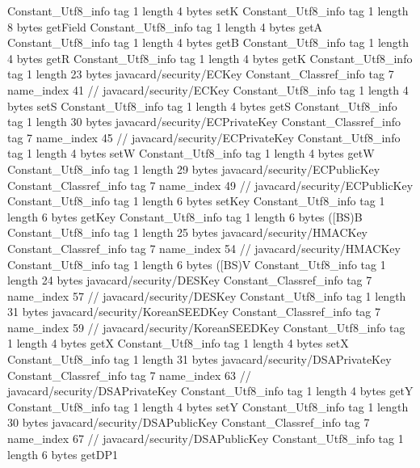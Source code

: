 {{{		}
		Constant_Utf8_info {
			tag	1
			length	4
			bytes	setK
		}
		Constant_Utf8_info {
			tag	1
			length	8
			bytes	getField
		}
		Constant_Utf8_info {
			tag	1
			length	4
			bytes	getA
		}
		Constant_Utf8_info {
			tag	1
			length	4
			bytes	getB
		}
		Constant_Utf8_info {
			tag	1
			length	4
			bytes	getR
		}
		Constant_Utf8_info {
			tag	1
			length	4
			bytes	getK
		}
		Constant_Utf8_info {
			tag	1
			length	23
			bytes	javacard/security/ECKey
		}
		Constant_Classref_info {
			tag	7
			name_index	41		// javacard/security/ECKey
		}
		Constant_Utf8_info {
			tag	1
			length	4
			bytes	setS
		}
		Constant_Utf8_info {
			tag	1
			length	4
			bytes	getS
		}
		Constant_Utf8_info {
			tag	1
			length	30
			bytes	javacard/security/ECPrivateKey
		}
		Constant_Classref_info {
			tag	7
			name_index	45		// javacard/security/ECPrivateKey
		}
		Constant_Utf8_info {
			tag	1
			length	4
			bytes	setW
		}
		Constant_Utf8_info {
			tag	1
			length	4
			bytes	getW
		}
		Constant_Utf8_info {
			tag	1
			length	29
			bytes	javacard/security/ECPublicKey
		}
		Constant_Classref_info {
			tag	7
			name_index	49		// javacard/security/ECPublicKey
		}
		Constant_Utf8_info {
			tag	1
			length	6
			bytes	setKey
		}
		Constant_Utf8_info {
			tag	1
			length	6
			bytes	getKey
		}
		Constant_Utf8_info {
			tag	1
			length	6
			bytes	([BS)B
		}
		Constant_Utf8_info {
			tag	1
			length	25
			bytes	javacard/security/HMACKey
		}
		Constant_Classref_info {
			tag	7
			name_index	54		// javacard/security/HMACKey
		}
		Constant_Utf8_info {
			tag	1
			length	6
			bytes	([BS)V
		}
		Constant_Utf8_info {
			tag	1
			length	24
			bytes	javacard/security/DESKey
		}
		Constant_Classref_info {
			tag	7
			name_index	57		// javacard/security/DESKey
		}
		Constant_Utf8_info {
			tag	1
			length	31
			bytes	javacard/security/KoreanSEEDKey
		}
		Constant_Classref_info {
			tag	7
			name_index	59		// javacard/security/KoreanSEEDKey
		}
		Constant_Utf8_info {
			tag	1
			length	4
			bytes	getX
		}
		Constant_Utf8_info {
			tag	1
			length	4
			bytes	setX
		}
		Constant_Utf8_info {
			tag	1
			length	31
			bytes	javacard/security/DSAPrivateKey
		}
		Constant_Classref_info {
			tag	7
			name_index	63		// javacard/security/DSAPrivateKey
		}
		Constant_Utf8_info {
			tag	1
			length	4
			bytes	getY
		}
		Constant_Utf8_info {
			tag	1
			length	4
			bytes	setY
		}
		Constant_Utf8_info {
			tag	1
			length	30
			bytes	javacard/security/DSAPublicKey
		}
		Constant_Classref_info {
			tag	7
			name_index	67		// javacard/security/DSAPublicKey
		}
		Constant_Utf8_info {
			tag	1
			length	6
			bytes	getDP1
}}}
